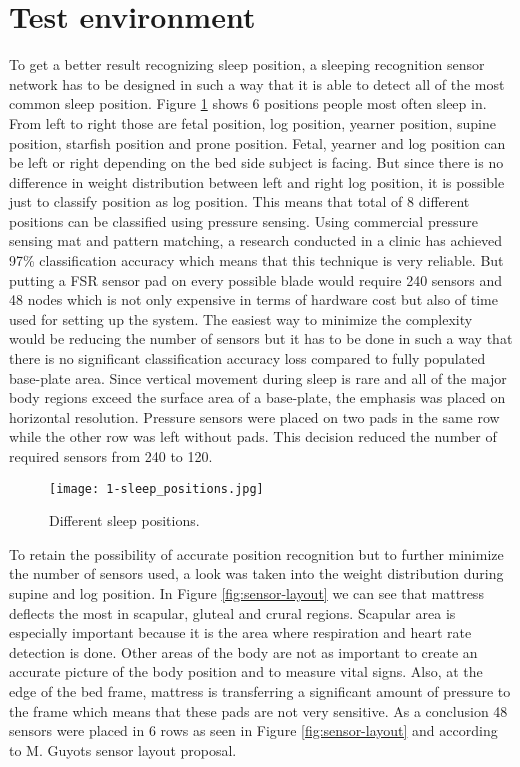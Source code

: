 \section{Test environment}
\label{ssec:test_environment}

To get a better result recognizing sleep position, a sleeping recognition sensor network has to be designed in such a way that it is able to detect all of the most common sleep position. Figure \ref{fig:sleep_positions} shows 6 positions people most often sleep in. From left to right those are fetal position, log position, yearner position, supine position, starfish position and prone position. Fetal, yearner and log position can be left or right depending on the bed side subject is facing. But since there is no difference in weight distribution between left and right log position, it is possible just to classify position as log position. This means that total of 8 different positions can be classified using pressure sensing. Using commercial pressure sensing mat and pattern matching, a research conducted in a clinic has achieved 97\% classification accuracy\cite{postures} which means that this technique is very reliable. But putting a \ac{FSR} sensor pad on every possible blade would require 240 sensors and 48 nodes which is not only expensive in terms of hardware cost but also of time used for setting up the system. The easiest way to minimize the complexity would be reducing the number of sensors but it has to be done in such a way that there is no significant classification accuracy loss compared to fully populated base-plate area. Since vertical movement during sleep is rare and all of the major body regions exceed the surface area of a base-plate, the emphasis was placed on horizontal resolution. Pressure sensors were placed on two pads in the same row while the other row was left without pads. This decision reduced the number of required sensors from 240 to 120.

\begin{figure}[h]
  \begin{center}
    \texttt{[image: 1-sleep\_positions.jpg]}
  \end{center}
  \caption{Different sleep positions.}
  \label{fig:sleep_positions}
\end{figure}

To retain the possibility of accurate position recognition but to further minimize the number of sensors used, a look was taken into the weight distribution during supine and log position. In Figure \ref{fig:sensor-layout} we can see that mattress deflects the most in scapular, gluteal and crural regions. Scapular area is especially important because it is the area where respiration and heart rate detection is done. Other areas of the body are not as important to create an accurate picture of the body position and to measure vital signs. Also, at the edge of the bed frame, mattress is transferring a significant amount of pressure to the frame which means that these pads are not very sensitive. As a conclusion 48 sensors were placed in 6 rows as seen in Figure \ref{fig:sensor-layout} and according to M. Guyots\cite{Guyot} sensor layout proposal.

